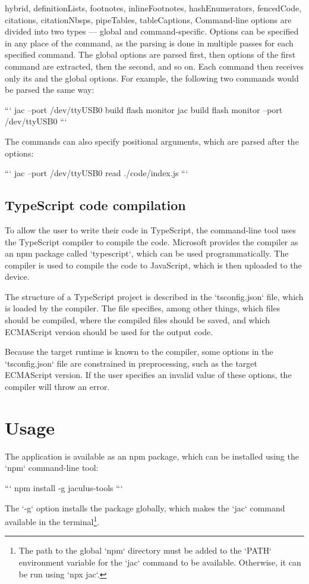 \begin{markdown*}{%
  hybrid,
  definitionLists,
  footnotes,
  inlineFootnotes,
  hashEnumerators,
  fencedCode,
  citations,
  citationNbsps,
  pipeTables,
  tableCaptions,
}
Command-line options are divided into two types --- global and command-specific. Options can be specified in any place of the command, as the parsing is done in multiple passes for each specified command. The global options are parsed first, then options of the first command are extracted, then the second, and so on. Each command then receives only its and the global options. For example, the following two commands would be parsed the same way:

```
jac --port /dev/ttyUSB0 build flash monitor
jac build flash monitor --port /dev/ttyUSB0
```

The commands can also specify positional arguments, which are parsed after the options:

```
jac --port /dev/ttyUSB0 read ./code/index.js
```

\subsection{TypeScript code compilation}

To allow the user to write their code in TypeScript, the command-line tool uses the TypeScript compiler to compile the code. Microsoft provides the compiler as an npm package called `typescript`, which can be used programmatically. The compiler is used to compile the code to JavaScript, which is then uploaded to the device.

The structure of a TypeScript project is described in the `tsconfig.json` file, which is loaded by the compiler. The file specifies, among other things, which files should be compiled, where the compiled files should be saved, and which ECMAScript version should be used for the output code.

Because the target runtime is known to the compiler, some options in the `tsconfig.json` file are constrained in preprocessing, such as the target ECMAScript version. If the user specifies an invalid value of these options, the compiler will throw an error.


\section{Usage}

The application is available as an npm package, which can be installed using the `npm` command-line tool:

```
npm install -g jaculus-tools
```

The `-g` option installs the package globally, which makes the `jac` command available in the terminal\footnote{The path to the global `npm` directory must be added to the `PATH` environment variable for the `jac` command to be available. Otherwise, it can be run using `npx jac`.}.


\end{markdown*}
